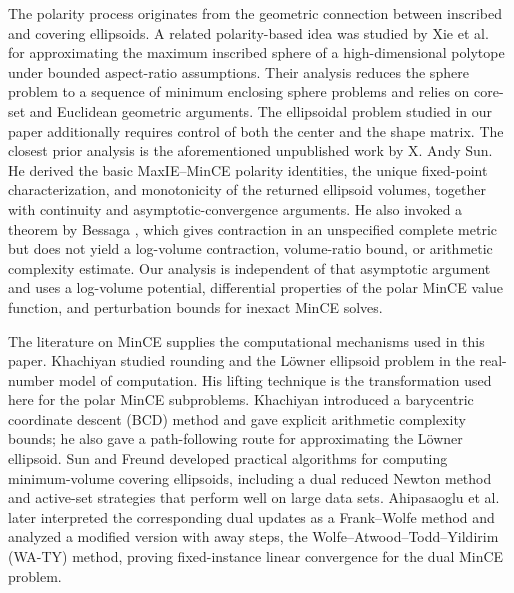 \documentclass[smallextended]{svjour3}
\begin{document}
The polarity process originates from the geometric connection between inscribed
and covering ellipsoids. A related polarity-based idea was studied by Xie et al.~\cite{xie2006maxsphere} for approximating the maximum
inscribed sphere of a high-dimensional polytope under bounded aspect-ratio
assumptions. Their analysis reduces the sphere problem to a sequence of minimum
enclosing sphere problems and relies on core-set and Euclidean geometric
arguments. The ellipsoidal problem studied in our paper additionally requires
control of both the center and the shape matrix. The closest prior analysis is
the aforementioned unpublished work by X. Andy Sun.
He derived the basic MaxIE--MinCE polarity identities, the unique fixed-point characterization, 
and monotonicity of the returned ellipsoid volumes, together with continuity and asymptotic-convergence arguments.
He also invoked a theorem by Bessaga \cite{bessaga1959converse}, which gives contraction in an unspecified complete metric but does not yield a log-volume contraction, volume-ratio bound, or arithmetic complexity estimate. Our analysis is independent of that asymptotic argument and uses a log-volume potential, differential
properties of the polar MinCE value function, and perturbation bounds for
inexact MinCE solves.

The literature on MinCE supplies the computational mechanisms used in
this paper. Khachiyan \cite{khachiyan1996rounding} studied rounding and the
L\"owner ellipsoid problem in the real-number model of computation. His
lifting technique is the transformation used here for the polar
MinCE subproblems. Khachiyan introduced a barycentric coordinate descent (BCD) method and gave
explicit arithmetic complexity bounds; he also gave a path-following route for
approximating the L\"owner ellipsoid. Sun and Freund
\cite{sunfreund2004mvce} developed practical algorithms for computing
minimum-volume covering ellipsoids, including a dual reduced Newton method and
active-set strategies that perform well on large data sets. Ahipasaoglu et al. \cite{ahipasaoglu2008fw} later interpreted the corresponding dual updates as a Frank--Wolfe method and analyzed a modified version with
away steps, the Wolfe--Atwood--Todd--Yildirim (WA-TY) method, proving
fixed-instance linear convergence for the dual MinCE problem.
\end{document}
